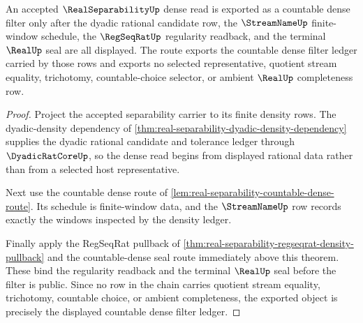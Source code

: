 \begin{theorem}
\label{thm:real-separability-countable-dense-choice-free-filter}
An accepted $\RealSeparabilityUp$ dense read is exported as a countable dense filter only after the dyadic rational candidate row, the $\StreamNameUp$ finite-window schedule, the $\RegSeqRatUp$ regularity readback, and the terminal $\RealUp$ seal are all displayed. The route exports the countable dense filter ledger carried by those rows and exports no selected representative, quotient stream equality, trichotomy, countable-choice selector, or ambient $\RealUp$ completeness row.
\end{theorem}
\begin{proof}
Project the accepted separability carrier to its finite density rows. The dyadic-density dependency of \autoref{thm:real-separability-dyadic-density-dependency} supplies the dyadic rational candidate and tolerance ledger through $\DyadicRatCoreUp$, so the dense read begins from displayed rational data rather than from a selected host representative.

Next use the countable dense route of \autoref{lem:real-separability-countable-dense-route}. Its schedule is finite-window data, and the $\StreamNameUp$ row records exactly the windows inspected by the density ledger.

Finally apply the RegSeqRat pullback of \autoref{thm:real-separability-regseqrat-density-pullback} and the countable-dense seal route immediately above this theorem. These bind the regularity readback and the terminal $\RealUp$ seal before the filter is public. Since no row in the chain carries quotient stream equality, trichotomy, countable choice, or ambient completeness, the exported object is precisely the displayed countable dense filter ledger.
\end{proof}
